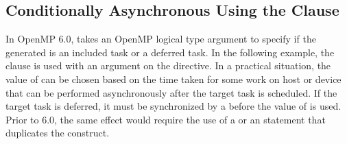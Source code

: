 \subsection{Conditionally Asynchronous  Using the  Clause}
\label{subsec:async_target_nowait_arg}

In OpenMP 6.0,  takes an OpenMP logical type argument to specify if the generated  is an included task or a deferred task. In the following example, the  clause is used with an argument on the  directive. In a practical situation, the value of  can be chosen based on the time taken for some work on host or device that can be performed asynchronously after the target task is scheduled. If the target task is deferred, it must be synchronized by a  before the value of  is used. Prior to 6.0, the same effect would require the use of a  or an  statement that duplicates the  construct.


